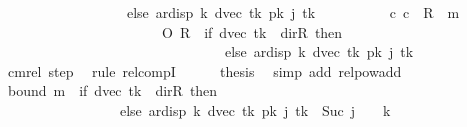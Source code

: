\begin{isabellebody}
\ \ \ \ \ \ \ \ \ \ \ \ \ \ \ \ \ \ else\ ar{\isacharunderscore}{\kern0pt}disp\ {\isacharquery}{\kern0pt}k\ {\isacharparenleft}{\kern0pt}dvec\ {\isacharquery}{\kern0pt}tk{\isacharparenright}{\kern0pt}\ {\isacharparenleft}{\kern0pt}{\isacharquery}{\kern0pt}pk\ j\ {\isacharquery}{\kern0pt}tk{\isacharparenright}{\kern0pt}{\isacharparenright}{\kern0pt}{\isacharparenright}{\kern0pt}{\isachardoublequoteclose}\isanewline
\ \ \isamarkupfalse%
\ {\isacharminus}{\kern0pt}\isanewline
\ \ \ \ \isamarkupfalse%
\ {\isachardoublequoteopen}{\isacharparenleft}{\kern0pt}c{}{\isacharcomma}{\kern0pt}\ c{\isacharprime}{\kern0pt}{\isacharparenright}{\kern0pt}\ {\isasymin}\ {\isacharquery}{\kern0pt}R\ {\isacharcircum}{\kern0pt}{\isacharcircum}{\kern0pt}\ m\isanewline
\ \ \ \ \ \ \ \ \ \ \ \ \ \ \ \ \ \ \ \ \ \ \ O\ {\isacharquery}{\kern0pt}R\ {\isacharcircum}{\kern0pt}{\isacharcircum}{\kern0pt}\ {\isacharparenleft}{\kern0pt}if\ dvec\ {\isacharquery}{\kern0pt}tk\ {\isacharequal}{\kern0pt}\ dir{\isachardot}{\kern0pt}R\ then\ {}\isanewline
\ \ \ \ \ \ \ \ \ \ \ \ \ \ \ \ \ \ \ \ \ \ \ \ \ \ \ \ \ \ \ \ else\ ar{\isacharunderscore}{\kern0pt}disp\ {\isacharquery}{\kern0pt}k\ {\isacharparenleft}{\kern0pt}dvec\ {\isacharquery}{\kern0pt}tk{\isacharparenright}{\kern0pt}\ {\isacharparenleft}{\kern0pt}{\isacharquery}{\kern0pt}pk\ j\ {\isacharquery}{\kern0pt}tk{\isacharparenright}{\kern0pt}{\isacharparenright}{\kern0pt}{\isachardoublequoteclose}\isanewline
\ \ \ \ \ \ \isamarkupfalse%
\ cm{\isacharunderscore}{\kern0pt}rel\ step\ \isamarkupfalse%
\ {\isacharparenleft}{\kern0pt}rule\ relcompI{\isacharparenright}{\kern0pt}\isanewline
\ \ \ \ \isamarkupfalse%
\ {\isacharquery}{\kern0pt}thesis\ \isamarkupfalse%
\ {\isacharparenleft}{\kern0pt}simp\ add{\isacharcolon}{\kern0pt}\ relpow{\isacharunderscore}{\kern0pt}add{\isacharparenright}{\kern0pt}\isanewline
\ \ \isamarkupfalse%
\isanewline
\ \ \isamarkupfalse%
\ bound{\isacharcolon}{\kern0pt}\ {\isachardoublequoteopen}m\ {\isacharplus}{\kern0pt}\ {\isacharparenleft}{\kern0pt}if\ dvec\ {\isacharquery}{\kern0pt}tk\ {\isacharequal}{\kern0pt}\ dir{\isachardot}{\kern0pt}R\ then\ {}\isanewline
\ \ \ \ \ \ \ \ \ \ \ \ \ \ \ \ \ else\ ar{\isacharunderscore}{\kern0pt}disp\ {\isacharquery}{\kern0pt}k\ {\isacharparenleft}{\kern0pt}dvec\ {\isacharquery}{\kern0pt}tk{\isacharparenright}{\kern0pt}\ {\isacharparenleft}{\kern0pt}{\isacharquery}{\kern0pt}pk\ j\ {\isacharquery}{\kern0pt}tk{\isacharparenright}{\kern0pt}{\isacharparenright}{\kern0pt}\ {\isasymle}\ Suc\ j\ {\isacharasterisk}{\kern0pt}\ {\isacharparenleft}{\kern0pt}{}\ {\isacharasterisk}{\kern0pt}\ {\isacharquery}{\kern0pt}k{\isacharparenright}{\kern0pt}{\isachardoublequoteclose}\isanewline

\end{isabellebody}
